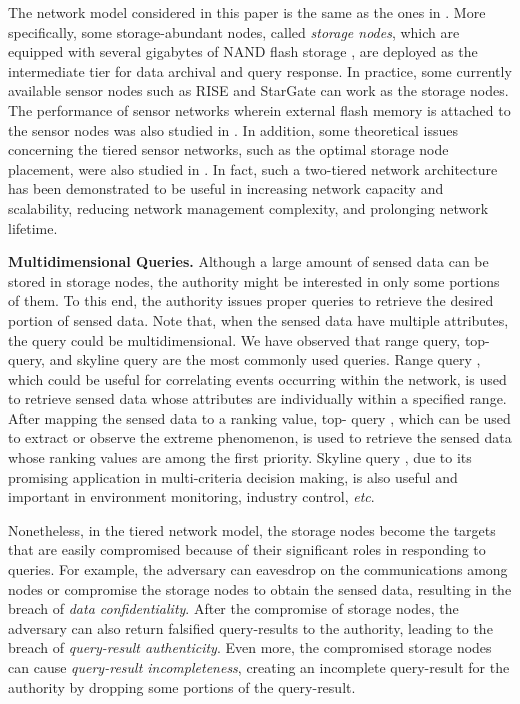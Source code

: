 \documentclass[conference]{IEEEtran}
\begin{document}
The network model considered in this paper is the same as the ones in \cite{rksegyy03,dglls05}. More specifically, some storage-abundant nodes, called \emph{storage nodes}, which are equipped with several gigabytes of NAND flash storage \cite{slm06}, are deployed as the intermediate tier for data archival and query response. In practice, some currently available sensor nodes such as RISE \cite{RISE} and StarGate \cite{startgate} can work as the storage nodes. The performance of sensor networks wherein external flash memory is attached to the sensor nodes was also studied in \cite{mdgs06}. In addition, some theoretical issues concerning the tiered sensor networks, such as the optimal storage node placement, were also studied in \cite{slm06,stlm07}. In fact, such a two-tiered network architecture has been demonstrated to be useful in increasing network capacity and scalability, reducing network management complexity, and prolonging network lifetime.

\textbf{Multidimensional Queries.} Although a large amount of sensed data can be stored in storage nodes, the authority might be interested in only some portions of them. To this end, the authority issues proper queries to retrieve the desired portion of sensed data. Note that, when the sensed data have multiple attributes, the query could be multidimensional. We have observed that range query, top- query, and skyline query are the most commonly used queries. Range query \cite{lkgh03,mfhh05}, which could be useful for correlating events occurring within the network, is used to retrieve sensed data whose attributes are individually within a specified range. After mapping the sensed data to a ranking value, top- query \cite{wxtl07}, which can be used to extract or observe the extreme phenomenon, is used to retrieve the sensed data whose ranking values are among the first  priority. Skyline query \cite{czg07,lcy08}, due to its promising application in multi-criteria decision making, is also useful and important in environment monitoring, industry control, \emph{etc}.

Nonetheless, in the tiered network model, the storage nodes become the targets that are easily compromised because of their significant roles in responding to queries. For example, the adversary can eavesdrop on the communications among nodes or compromise the storage nodes to obtain the sensed data, resulting in the breach of \emph{data confidentiality}. After the compromise of storage nodes, the adversary can also return falsified query-results to the authority, leading to the breach of \emph{query-result authenticity}. Even more, the compromised storage nodes can cause \emph{query-result incompleteness}, creating an incomplete query-result for the authority by dropping some portions of the query-result.
\end{document}
